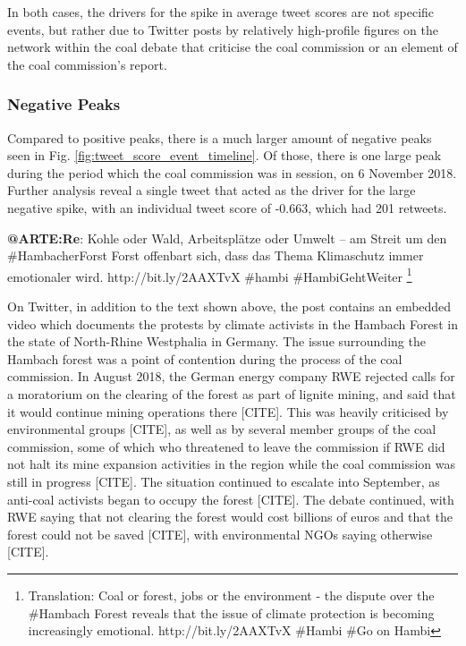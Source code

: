 \documentclass[12pt,onecolumn,twoside]{layout}
\begin{document}
In both cases, the drivers for the spike in average tweet scores are not specific events, but rather due to Twitter posts by relatively high-profile figures on the network within the coal debate that criticise the coal commission or an element of the coal commission's report. 

\subsubsection*{Negative Peaks} %
Compared to positive peaks, there is a much larger amount of negative peaks seen in Fig. \ref{fig:tweet_score_event_timeline}. Of those, there is one large peak during the period which the coal commission was in session, on 6 November 2018. Further analysis reveal a single tweet that acted as the driver for the large negative spike, with an individual tweet score of -0.663, which had 201 retweets. 

\begin{displayquote}
	\textbf{@ARTE:Re}: Kohle oder Wald, Arbeitsplätze oder Umwelt – am Streit um den \#HambacherForst Forst offenbart sich, dass das Thema Klimaschutz immer emotionaler wird. http://bit.ly/2AAXTvX \#hambi \#HambiGehtWeiter
	\footnote{Translation: Coal or forest, jobs or the environment - the dispute over the \#Hambach Forest reveals that the issue of climate protection is becoming increasingly emotional. http://bit.ly/2AAXTvX \#Hambi \#Go on Hambi}
\end{displayquote}

On Twitter, in addition to the text shown above, the post contains an embedded video which documents the protests by climate activists in the Hambach Forest in the state of North-Rhine Westphalia in Germany. The issue surrounding the Hambach forest was a point of contention during the process of the coal commission. In August 2018, the German energy company RWE rejected calls for a moratorium on the clearing of the forest as part of lignite mining, and said that it would continue mining operations there [CITE]. This was heavily criticised by environmental groups [CITE], as well as by several member groups of the coal commission, some of which who threatened to leave the commission if RWE did not halt its mine expansion activities in the region while the coal commission was still in progress [CITE]. The situation continued to escalate into September, as anti-coal activists began to occupy the forest [CITE]. The debate continued, with RWE saying that not clearing the forest would cost billions of euros and that the forest could not be saved [CITE], with environmental NGOs saying otherwise [CITE].
\end{document}
